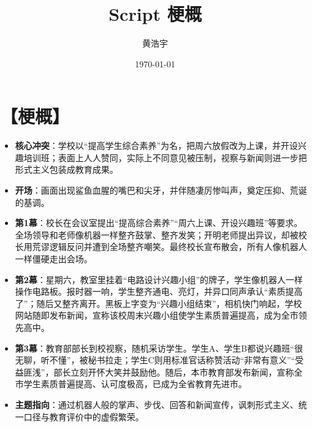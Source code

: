 \documentclass[11pt, a4paper]{article}
\title{Script 梗概}
\author{黄浩宇}
\date{\today}
\begin{document}
        \maketitle
        \newpage
        \tableofcontents

        \newpage

        \section{【梗概】}

        \begin{itemize}[leftmargin=2em, itemsep=0.2em]
                \item \textbf{核心冲突}：学校以“提高学生综合素养”为名，把周六放假改为上课，并开设兴趣培训班；表面上人人赞同，实际上不同意见被压制，视察与新闻则进一步把形式主义包装成教育成果。
                \item \textbf{开场}：画面出现鲨鱼血腥的嘴巴和尖牙，并伴随凄厉惨叫声，奠定压抑、荒诞的基调。
                \item \textbf{第1幕}：校长在会议室提出“提高综合素养”“周六上课、开设兴趣班”等要求。全场领导和老师像机器一样整齐鼓掌、整齐发笑；开明老师提出异议，却被校长用荒谬逻辑反问并遭到全场整齐嘲笑。最终校长宣布散会，所有人像机器人一样僵硬走出会场。
                \item \textbf{第2幕}：星期六，教室里挂着“电路设计兴趣小组”的牌子，学生像机器人一样操作电路板。报时器一响，学生整齐通电、亮灯，并异口同声承认“素质提高了”；随后又整齐离开。黑板上字变为“兴趣小组结束”，相机快门响起，学校网站随即发布新闻，宣称该校周末兴趣小组使学生素质普遍提高，成为全市领先高中。
                \item \textbf{第3幕}：教育部部长到校视察，随机采访学生。学生A、学生B都说兴趣班“很无聊，听不懂”，被秘书拉走；学生C则用标准官话称赞活动“非常有意义”“受益匪浅”，部长立刻开怀大笑并鼓励他。随后，本市教育部发布新闻，宣称全市学生素质普遍提高、认可度极高，已成为全省教育先进市。
                \item \textbf{主题指向}：通过机器人般的掌声、步伐、回答和新闻宣传，讽刺形式主义、统一口径与教育评价中的虚假繁荣。
        \end{itemize}
\end{document}
